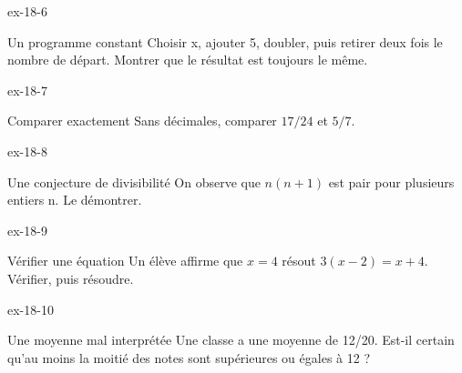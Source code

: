 \clearpage{}
\begin{blocLivre}{ex-18-6}\begin{exercice}[2]{Un programme constant}
Choisir x, ajouter 5, doubler, puis retirer deux fois le nombre de départ. Montrer que le résultat est toujours le même.
\end{exercice}\end{blocLivre}
\begin{blocLivre}{ex-18-7}\begin{exercice}[2]{Comparer exactement}
Sans décimales, comparer $17/24$ et $5/7$.
\end{exercice}\end{blocLivre}
\begin{blocLivre}{ex-18-8}\begin{exercice}[2]{Une conjecture de divisibilité}
On observe que $n(n+1)$ est pair pour plusieurs entiers n. Le démontrer.
\end{exercice}\end{blocLivre}
\begin{blocLivre}{ex-18-9}\begin{exercice}[2]{Vérifier une équation}
Un élève affirme que $x=4$ résout $3(x-2)=x+4$. Vérifier, puis résoudre.
\end{exercice}\end{blocLivre}
\begin{blocLivre}{ex-18-10}\begin{exercice}[2]{Une moyenne mal interprétée}
Une classe a une moyenne de 12/20. Est-il certain qu’au moins la moitié des notes sont supérieures ou égales à 12 ?
\end{exercice}\end{blocLivre}

